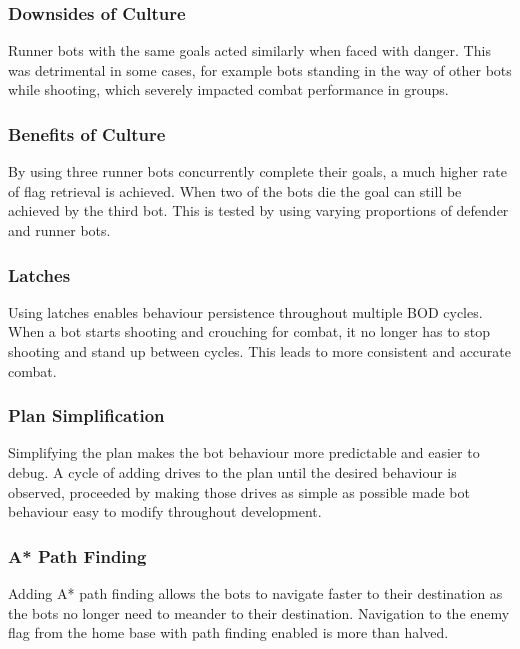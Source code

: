 \documentclass[a4paper,12pt,twocolumn]{report}
\begin{document}
\subsubsection{Downsides of Culture}
Runner bots with the same goals acted similarly when faced with danger. This was detrimental in some cases, for example bots standing in the way of other bots while shooting, which severely impacted combat performance in groups.

\subsubsection{Benefits of Culture}
By using three runner bots concurrently complete their goals, a much higher rate of flag retrieval is achieved. When two of the bots die the goal can still be achieved by the third bot. This is tested by using varying proportions of defender and runner bots.

\subsubsection{Latches}
Using latches enables behaviour persistence throughout multiple BOD cycles. When a bot starts shooting and crouching for combat, it no longer has to stop shooting and stand up between cycles. This leads to more consistent and accurate combat.

\subsubsection{Plan Simplification}
Simplifying the plan makes the bot behaviour more predictable and easier to debug. A cycle of adding drives to the plan until the desired behaviour is observed, proceeded by making those drives as simple as possible made bot behaviour easy to modify throughout development.

\subsubsection{A* Path Finding}
Adding A* path finding allows the bots to navigate faster to their destination as the bots no longer need to meander to their destination. Navigation to the enemy flag from the home base with path finding enabled is more than halved. 
\end{document}
